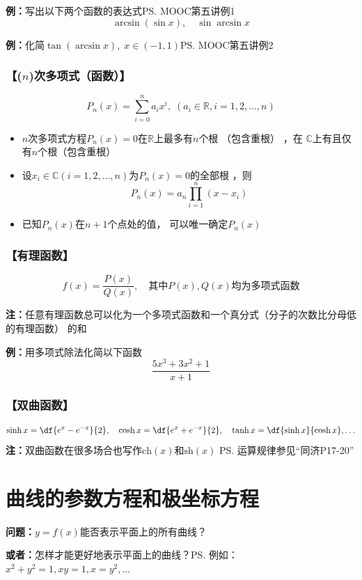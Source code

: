 {\bf 例：}写出以下两个函数的表达式\ps{MOOC第五讲例1}
$$\arcsin(\sin x),\quad \sin\arcsin x$$

{\bf 例：}化简$\tan(\arcsin x),\;x\in(-1,1)$\ps{MOOC第五讲例2}

\subsubsection{【($n$)次多项式（函数）】}

  $$P_n(x)=\sum_{i=0}^na_ix^i,
  \;(a_i\in\mathbb{R},i=1,2,\ldots,n)$$
  \begin{itemize}
    \item { $n$次多项式方程$P_n(x)=0$在$\mathbb{R}$上最多有$n$个根 （包含重根） ，在
    $\mathbb{C}$上有且仅有$n$个根（包含重根）}
    \item { 设$x_i\in\mathbb{C}(i=1,2,\ldots,n)$为$P_n(x)=0$的全部根 ，则
    $$P_n(x)=a_n\prod_{i=1}^n(x-x_i)$$}
    \item { 已知$P_n(x)$在$n+1$个点处的值， 可以唯一确定$P_n(x)$}
  \end{itemize}

\subsubsection{【有理函数】}

$$f(x)=\frac{P(x)}{Q(x)}, \quad\mbox{其中}P(x),Q(x)\mbox{均为多项式函数}$$
  
{\bf 注：}任意有理函数总可以化为一个多项式函数和一个真分式（分子的次数比分母低的有理函数）
的和
	  
{{\bf 例：}用多项式除法化简以下函数}
$$\frac{5x^3+3x^2+1}{x+1}$$

\subsubsection{【双曲函数】}

{\small $$\sinh x =\df{e^x-e^{-x}}{2}, \quad
\cosh x =\df{e^x+e^{-x}}{2}, \quad\tanh x=\df{\sinh
x}{\cosh x}, \ldots$$}
{\bf 注：}双曲函数在很多场合也写作$\mathrm{ch}(x)$和$\mathrm{sh}(x)$
\ps{运算规律参见“同济P17-20”}

\section{曲线的参数方程和极坐标方程}

{\bf 问题：}$y=f(x)$能否表示平面上的所有曲线？
	
{\bf 或者：}怎样才能更好地表示平面上的曲线？\ps{例如：$x^2+y^2=1,xy=1,x=y^2,\ldots$}

